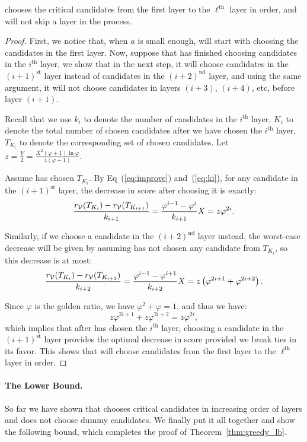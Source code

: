\begin{lemma}
\label{lem:greedyopt2}
\g{}  chooses the critical candidates from the first layer to the $\ell^{\text{th}}$ layer in order, and will not skip a layer in the process.
\end{lemma}
\begin{proof}
First, we notice that, when $a$ is small enough, \g{} will start with choosing the candidates in the first layer. Now, suppose that \g{} has finished choosing candidates in the $i^{\text{th}}$ layer, we show that in the next step, it will choose candidates in the $(i + 1)^{\text{st}}$ layer instead of candidates in the $(i + 2)^{\text{nd}}$ layer, and using the same argument, it will not choose candidates in layers $(i + 3)$, $(i + 4)$, etc, before layer $(i + 1)$.

Recall that we use $k_i$ to denote the number of candidates in the $i^{\text{th}}$ layer,  $K_i$ to denote the total number of chosen candidates after we have chosen the $i^{\text{th}}$ layer, $T_{K_i}$ to denote the corresponding set of chosen candidates. Let $z = \frac{Y}{2} = \frac{X^2(\varphi + 1)\ln\varphi}{4(\varphi - 1)}$. 

Assume \g{} has chosen $T_{K_i}$. By Eq~(\ref{eq:improve}) and~(\ref{eq:ki}), for any candidate in the $(i + 1)^{\text{st}}$ layer, the decrease in score after choosing it is exactly:
$$ \frac{r_{\mathcal{V}}(T_{K_{i}}) - r_{\mathcal{V}}(T_{K_{i+1}})}{k_{i+1}} = \frac{\varphi^{i - 1} - \varphi^i}{k_{i+1}} X = z\varphi^{2i}.$$

Similarly, if we choose a candidate in the $(i + 2)^{\text{nd}}$ layer instead, the worst-case decrease will be given by assuming \g{} has not chosen any candidate from $T_{K_i}$, so this decrease is at most:
$$ \frac{r_{\mathcal{V}}(T_{K_{i}}) - r_{\mathcal{V}}(T_{K_{i+2}})}{k_{i+2}} = \frac{\varphi^{i - 1} - \varphi^{i+1}}{k_{i+2}} X = z \left(\varphi^{2i+1} +  \varphi^{2i+2} \right).$$

Since $\varphi$ is the golden ratio, we have $\varphi^2 + \varphi = 1$, and thus we have:
$$z\varphi^{2i+1} + z\varphi^{2i+2} = z\varphi^{2i},$$
which implies that after \g{} has chosen the $i^{\text{th}}$ layer, choosing a candidate in the $(i + 1)^{\text{st}}$ layer provides the optimal decrease in score provided we break ties in its favor. This shows that \g{}  will choose candidates from the first layer to the $\ell^{\text{th}}$ layer in order.
\end{proof}

\paragraph{The Lower Bound.} So far we have shown that \g{} chooses critical candidates in increasing order of layers and does not choose dummy candidates. We finally put it all together and show the following bound, which completes the proof of Theorem~\ref{thm:greedy_lb}. 

